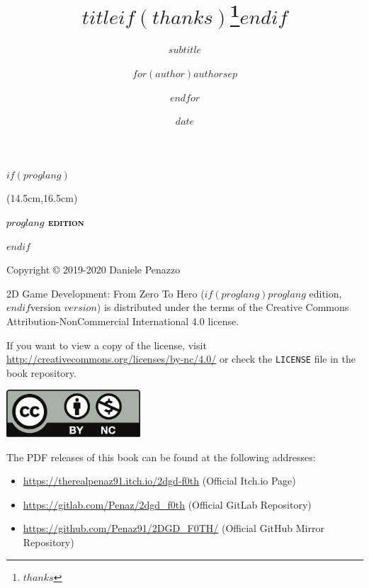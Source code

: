 \documentclass{article}
\title{$title$$if(thanks)$\thanks{$thanks$}$endif$}
\subtitle{$subtitle$}
\author{$for(author)$$author$$sep$ \and $endfor$}
\institute{$for(institute)$$institute$$sep$ \and $endfor$}
\date{$date$}
\begin{document}
\pagestyle{empty}
\begin{titlepage}
    \BgThispage
    $if(proglang)$
    \begin{textblock*}{5cm}(14.5cm,16.5cm) %
        \begin{center}
            \textcolor{black}{\Large\textbf{\textsc{$proglang$ edition}}}
        \end{center}
    \end{textblock*}
    $endif$
    \null
    \newpage
\end{titlepage}

\clearpage
\null
Copyright © 2019-2020 Daniele Penazzo\\

\vspace{12pt}

2D Game Development: From Zero To Hero ($if(proglang)$$proglang$ edition, $endif$version $version$) is distributed under the terms of the Creative Commons Attribution-NonCommercial International 4.0 license.\\

\vspace{12pt}

If you want to view a copy of the license, visit \url{http://creativecommons.org/licenses/by-nc/4.0/} or check the \texttt{LICENSE} file in the book repository.

\vspace{24pt}

\includegraphics[width=50mm]{images/by-nc.pdf}

The PDF releases of this book can be found at the following addresses:
\begin{itemize}
    \item \url{https://therealpenaz91.itch.io/2dgd-f0th} (Official Itch.io Page)
    \item \url{https://gitlab.com/Penaz/2dgd_f0th} (Official GitLab Repository)
    \item \url{https://github.com/Penaz91/2DGD_F0TH/} (Official GitHub Mirror Repository)
\end{itemize}
\end{document}

